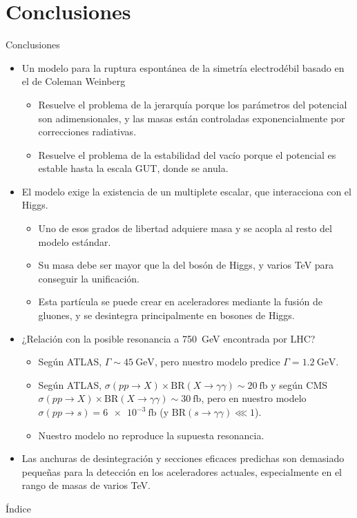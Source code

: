 \documentclass{beamer}
\begin{document}
\section{Conclusiones}
\begin{frame}{Conclusiones}
\begin{itemize}
\item<only@1> Un modelo para la ruptura espontánea de la simetría electrodébil basado en el de Coleman Weinberg
\begin{itemize}
\item Resuelve el problema de la jerarquía porque los parámetros del potencial son adimensionales, y las masas están controladas exponencialmente por correcciones radiativas.
\item Resuelve el problema de la estabilidad del vacío porque el potencial es estable hasta la escala GUT, donde se anula.
\end{itemize}
\item<only@2> El modelo exige la existencia de un multiplete escalar, que interacciona con el Higgs. 
\begin{itemize}
\item Uno de esos grados de libertad adquiere masa y se acopla al resto del modelo estándar.
\item Su masa debe ser mayor que la del bosón de Higgs, y varios \si{\tera\electronvolt} para conseguir la unificación.
\item Esta partícula se puede crear en aceleradores mediante la fusión de gluones, y se desintegra principalmente en bosones de Higgs. 
\end{itemize}
\item<only@3> ¿Relación con la posible resonancia a \SI{750}{\giga\electronvolt} encontrada por LHC?
\begin{itemize}
\item Según ATLAS, $\Gamma\sim \SI{45}{\giga\electronvolt}$, pero nuestro modelo predice $\Gamma = \SI{1.2}{\giga\electronvolt}$.
\item Según ATLAS, $\sigma(pp\to X)\times \mathrm{BR}(X \to \gamma\gamma) \sim \SI{20}{\femto\barn}$ y según CMS $\sigma(pp\to X)\times \mathrm{BR}(X \to \gamma\gamma) \sim \SI{30}{\femto\barn}$, pero en nuestro modelo $\sigma(pp\to s)= \SI{6e-3}{\femto\barn}$ (y $\mathrm{BR}(s \to \gamma\gamma)\lll 1$).
\item Nuestro modelo no reproduce la supuesta resonancia.
\end{itemize}
\item<only@3> Las anchuras de desintegración y secciones eficaces predichas son demasiado pequeñas para la detección en los aceleradores actuales, especialmente en el rango de masas de varios \si{\tera\electronvolt}.
\end{itemize}
\end{frame}


\begin{frame}[t]{Índice}
\tableofcontents
\end{frame}
\end{document}

